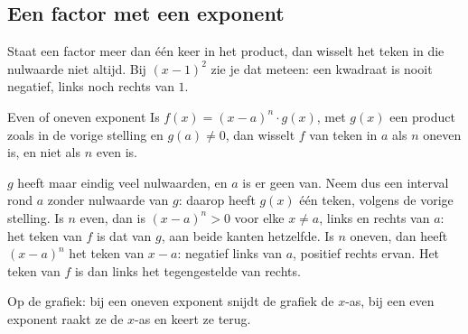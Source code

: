 \begin{oefeningen}
\end{oefeningen}

\subsection{Een factor met een exponent}

Staat een factor meer dan één keer in het product, dan wisselt het teken in die nulwaarde niet altijd. Bij $(x - 1)^2$ zie je dat meteen: een kwadraat is nooit negatief, links noch rechts van $1$.

\begin{theorie}
\begin{stelling}{Even of oneven exponent}
Is $f(x) = (x - a)^n \cdot g(x)$, met $g(x)$ een product zoals in de vorige stelling en $g(a) \neq 0$, dan wisselt $f$ van teken in $a$ als $n$ oneven is, en niet als $n$ even is.
\end{stelling}

\begin{bewijs}
$g$ heeft maar eindig veel nulwaarden, en $a$ is er geen van. Neem dus een interval rond $a$ zonder nulwaarde van $g$: daarop heeft $g(x)$ één teken, volgens de vorige stelling. Is $n$ even, dan is $(x - a)^n > 0$ voor elke $x \neq a$, links en rechts van $a$: het teken van $f$ is dat van $g$, aan beide kanten hetzelfde. Is $n$ oneven, dan heeft $(x - a)^n$ het teken van $x - a$: negatief links van $a$, positief rechts ervan. Het teken van $f$ is dan links het tegengestelde van rechts.
\end{bewijs}
\end{theorie}

Op de grafiek: bij een oneven exponent snijdt de grafiek de $x$-as, bij een even exponent raakt ze de $x$-as en keert ze terug.


